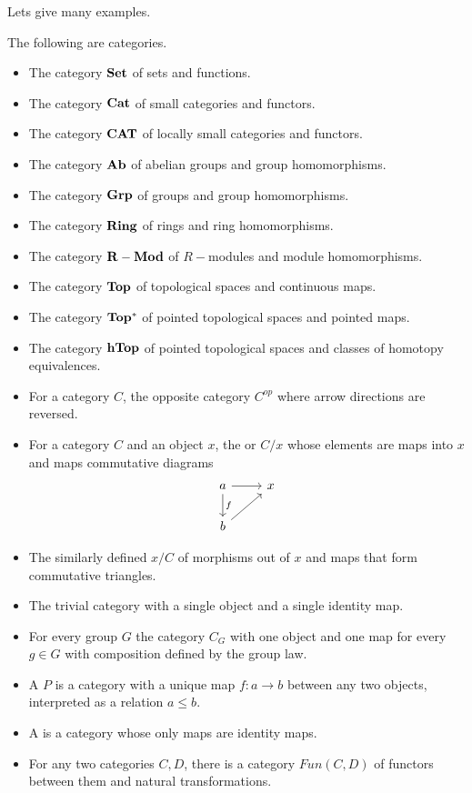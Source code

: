 Lets give many examples.
\begin{example}[Categories]
The following are categories.
\begin{itemize}
    \item The category ${\mathbf{Set}}$ of sets and functions.
    \item The category ${\mathbf{Cat}}$ of small categories and functors.
    \item The category ${\mathbf{CAT}}$ of locally small categories and functors.
    \item The category ${\mathbf{Ab}}$ of abelian groups and group homomorphisms.
    \item The category ${\mathbf{Grp}}$ of groups and group homomorphisms.
    \item The category ${\mathbf{Ring}}$ of rings and ring homomorphisms.
    \item The category ${\mathbf{R-Mod}}$ of $R-$modules and module homomorphisms.
    \item The category ${\mathbf{Top}}$ of topological spaces and continuous maps.
    \item The category ${\mathbf{Top^*}}$ of pointed topological spaces and pointed maps.
    \item The category ${\mathbf{hTop}}$ of pointed topological spaces and classes of homotopy equivalences.
    \item For a category $C$, the opposite category $C^{op}$ where arrow directions are reversed.
    \item For a category $C$ and an object $x$, the  or  $C/x$ whose elements are maps into $x$ and maps commutative diagrams
\[\begin{tikzcd}
a \arrow[r] \arrow[d, "f"] & x \\
b \arrow[ru]               &  
\end{tikzcd}\]
    \item The similarly defined  $x/C$ of morphisms out of $x$ and maps that form commutative triangles.
    \item The trivial category with a single object and a single identity map.
    \item For every group $G$ the category $C_G$ with one object and one map for every $g\in G$ with composition defined by the group law.
    \item A  $P$ is a category with a unique map $f:a\rightarrow b$ between any two objects, interpreted as a relation $a\leq b$.
    \item A  is a category whose only maps are identity maps.
    \item For any two categories $C,D$, there is a category $Fun(C,D)$ of functors between them and natural transformations.
\end{itemize}
\end{example}

